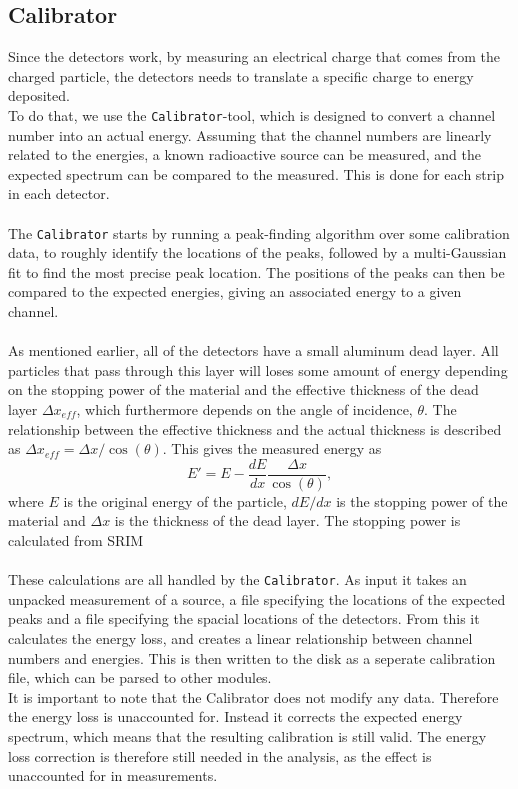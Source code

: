 \subsection{Calibrator}
Since the detectors work, by measuring an electrical charge that comes from the charged particle, the detectors needs to translate a specific charge to energy deposited. \\
To do that, we use the \texttt{Calibrator}-tool, which is designed to convert a channel number into an actual energy. Assuming that the channel numbers are linearly related to the energies, a known radioactive source can be measured, and the expected spectrum can be compared to the measured. This is done for each strip in each detector.
\\
\\
The \texttt{Calibrator} starts by running a peak-finding algorithm over some calibration data, to roughly identify the locations of the peaks, followed by a multi-Gaussian fit to find the most precise peak location. 
The positions of the peaks can then be compared to the expected energies, giving an associated energy to a given channel. \\
\\
As mentioned earlier, all of the detectors have a small aluminum dead layer. All particles that pass through this layer will loses some amount of energy depending on the stopping power of the material and the effective thickness of the dead layer $\Delta x_{eff}$, which furthermore depends on the angle of incidence, $\theta$. 
The relationship between the effective thickness and the actual thickness is described as $\Delta x_{eff} = \Delta x/ \cos(\theta)$. This gives the measured energy as 
\begin{equation*}
E' = E - \dfrac{dE}{dx} \dfrac{\Delta x}{\cos(\theta)},
\end{equation*}
where $E$ is the original energy of the particle, $dE/dx$ is the stopping power of the material and $\Delta x$ is the thickness of the dead layer. The stopping power is calculated from SRIM \cite{ZIEGLER20101818} \\
\\
These calculations are all handled by the \texttt{Calibrator}. 
As input it takes an unpacked measurement of a source, a file specifying the locations of the expected peaks and a file specifying the spacial locations of the detectors. 
From this it calculates the energy loss, and creates a linear relationship between channel numbers and energies. This is then written to the disk as a seperate calibration file, which can be parsed to other modules.\\
It is important to note that the Calibrator does not modify any data. Therefore the energy loss is unaccounted for. Instead it corrects the expected energy spectrum, which means that the resulting calibration is still valid. The energy loss correction is therefore still needed in the analysis, as the effect is unaccounted for in measurements. 


